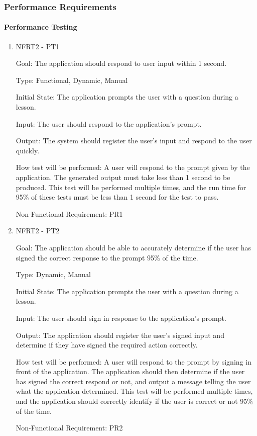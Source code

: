 \documentclass[12pt, titlepage]{article}
\begin{document}
\subsubsection{Performance Requirements}

\paragraph{Performance Testing}

\begin{enumerate}

\item{NFRT2 - PT1}

Goal: The application should respond to user input within 1 second. 

Type: Functional, Dynamic, Manual
					
Initial State: The application prompts the user with a question during a lesson. 
					
Input: The user should respond to the application's prompt.
					
Output: The system should register the user's input and respond to the user quickly. 
					
How test will be performed: A user will respond to the prompt given by the application. The generated output must take less than 1 second to be produced. This test will be performed multiple times, and the run time for 95\% of these tests must be less than 1 second for the test to pass. 

Non-Functional Requirement: PR1

\item{NFRT2 - PT2}

Goal: The application should be able to accurately determine if the user has signed the correct response to the prompt 95\% of the time. 

Type: Dynamic, Manual
					
Initial State: The application prompts the user with a question during a lesson. 
					
Input: The user should sign in response to the application's prompt.
					
Output: The application should register the user's signed input and determine if they have signed the required action correctly.
					
How test will be performed: A user will respond to the prompt by signing in front of the application. The application should then determine if the user has signed the correct respond or not, and output a message telling the user what the application determined. This test will be performed multiple times, and the application should correctly identify if the user is correct or not 95\% of the time.

Non-Functional Requirement: PR2

\end{enumerate}
\end{document}
